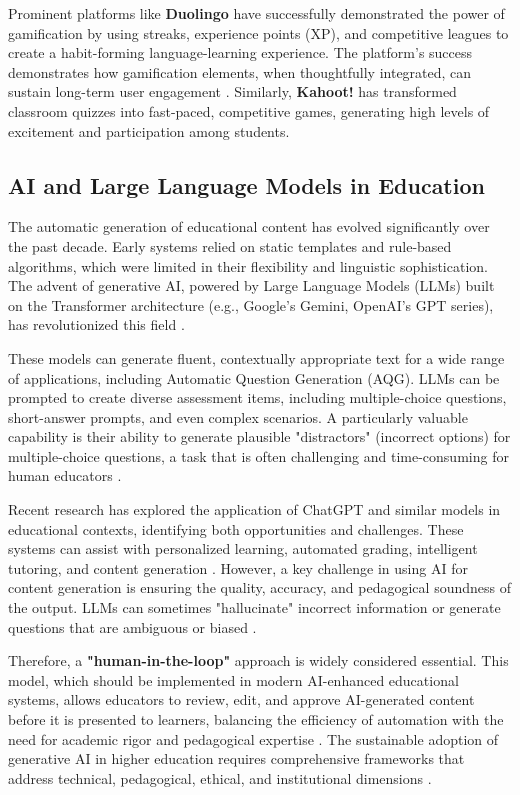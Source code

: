 Prominent platforms like \textbf{Duolingo} have successfully demonstrated the power of gamification by using streaks, experience points (XP), and competitive leagues to create a habit-forming language-learning experience. The platform's success demonstrates how gamification elements, when thoughtfully integrated, can sustain long-term user engagement \citep{oliveira2023}. Similarly, \textbf{Kahoot!} has transformed classroom quizzes into fast-paced, competitive games, generating high levels of excitement and participation among students.

\subsection{AI and Large Language Models in Education}

The automatic generation of educational content has evolved significantly over the past decade. Early systems relied on static templates and rule-based algorithms, which were limited in their flexibility and linguistic sophistication. The advent of generative AI, powered by Large Language Models (LLMs) built on the Transformer architecture (e.g., Google's Gemini, OpenAI's GPT series), has revolutionized this field \citep{gemini2023}.

These models can generate fluent, contextually appropriate text for a wide range of applications, including Automatic Question Generation (AQG). LLMs can be prompted to create diverse assessment items, including multiple-choice questions, short-answer prompts, and even complex scenarios. A particularly valuable capability is their ability to generate plausible "distractors" (incorrect options) for multiple-choice questions, a task that is often challenging and time-consuming for human educators \citep{biancini2024}.

Recent research has explored the application of ChatGPT and similar models in educational contexts, identifying both opportunities and challenges. These systems can assist with personalized learning, automated grading, intelligent tutoring, and content generation \citep{kasneci2023}. However, a key challenge in using AI for content generation is ensuring the quality, accuracy, and pedagogical soundness of the output. LLMs can sometimes "hallucinate" incorrect information or generate questions that are ambiguous or biased \citep{kasneci2023}.

Therefore, a \textbf{"human-in-the-loop"} approach is widely considered essential. This model, which should be implemented in modern AI-enhanced educational systems, allows educators to review, edit, and approve AI-generated content before it is presented to learners, balancing the efficiency of automation with the need for academic rigor and pedagogical expertise \citep{biancini2024}. The sustainable adoption of generative AI in higher education requires comprehensive frameworks that address technical, pedagogical, ethical, and institutional dimensions \citep{kasneci2023}.

